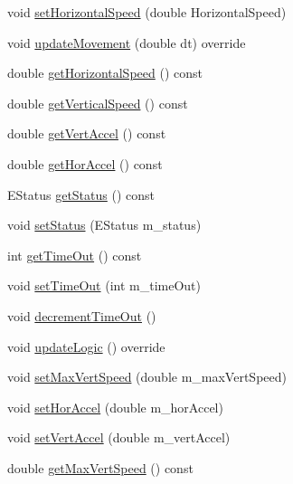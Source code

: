 \begin{DoxyCompactItemize}
\item 
void \hyperlink{classroadfighter_1_1MovingObject_a20321fab6dfee452486f80d744d7002d}{set\+Horizontal\+Speed} (double Horizontal\+Speed)
\item 
void \hyperlink{classroadfighter_1_1MovingObject_ac1918d96dac118c4bd7d99168d92867c}{update\+Movement} (double dt) override
\item 
double \hyperlink{classroadfighter_1_1MovingObject_a26e23531dea4a66777f7a3fd61fa4a21}{get\+Horizontal\+Speed} () const
\item 
double \hyperlink{classroadfighter_1_1MovingObject_a50a29cec3ac0234325691f2efd0e7fe1}{get\+Vertical\+Speed} () const
\item 
double \hyperlink{classroadfighter_1_1MovingObject_a299e4d456864595ba066c89f7de58afe}{get\+Vert\+Accel} () const
\item 
double \hyperlink{classroadfighter_1_1MovingObject_a00ed8d1d735142a802792954089e2081}{get\+Hor\+Accel} () const
\item 
E\+Status \hyperlink{classroadfighter_1_1MovingObject_a05cbcd45fb2827a26f54500a897862b4}{get\+Status} () const
\item 
void \hyperlink{classroadfighter_1_1MovingObject_ab1f380b45e20697c45b6ed7b466ca0e9}{set\+Status} (E\+Status m\+\_\+status)
\item 
int \hyperlink{classroadfighter_1_1MovingObject_a447e1cfbdca177040016cd25f736d7df}{get\+Time\+Out} () const
\item 
void \hyperlink{classroadfighter_1_1MovingObject_a3e0c64a4f67f03e84fc388127123c2df}{set\+Time\+Out} (int m\+\_\+time\+Out)
\item 
void \hyperlink{classroadfighter_1_1MovingObject_aa968b69523ee3cfe64fcd5342732ba5a}{decrement\+Time\+Out} ()
\item 
void \hyperlink{classroadfighter_1_1MovingObject_a2c5d69054a59fc5c6d7458f864ee9d57}{update\+Logic} () override
\item 
void \hyperlink{classroadfighter_1_1MovingObject_a193dbc310915e3f81071170b3250516e}{set\+Max\+Vert\+Speed} (double m\+\_\+max\+Vert\+Speed)
\item 
void \hyperlink{classroadfighter_1_1MovingObject_a47bcc94c24b3b6b047ecf45c22574d09}{set\+Hor\+Accel} (double m\+\_\+hor\+Accel)
\item 
void \hyperlink{classroadfighter_1_1MovingObject_a52313182d28796bf27762047c8b289fd}{set\+Vert\+Accel} (double m\+\_\+vert\+Accel)
\item 
double \hyperlink{classroadfighter_1_1MovingObject_a5291cd441cc9b4f4650ff14c584f28d2}{get\+Max\+Vert\+Speed} () const
\end{DoxyCompactItemize}


